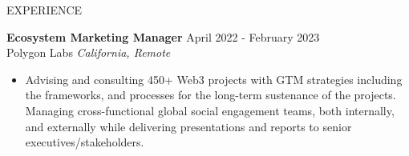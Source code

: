 \documentclass{resume} %
\begin{document}

\begin{rSection}{EXPERIENCE}




\textbf{Ecosystem Marketing Manager} \hfill April 2022 - February 2023\\
Polygon Labs \hfill \textit{California, Remote}
 \begin{itemize}
    \itemsep -3pt {} 
    \item Advising and consulting 450+ Web3 projects with GTM strategies including the frameworks, and processes for the long-term sustenance of the projects. Managing cross-functional global social engagement teams, both internally, and externally while delivering presentations and reports to senior executives/stakeholders.

 \end{itemize}



\end{rSection}
\end{document}
